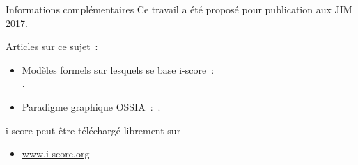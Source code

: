 \begin{block}{Informations complémentaires}
	Ce travail a été proposé pour publication aux JIM 2017.
      {Articles sur ce sujet~:
      \begin{itemize}
        \item Modèles formels sur lesquels se base i-score~:~\\\cite{allombert_system_2007,arias2016authoring}.
        \item Paradigme graphique OSSIA~:~\cite{celerier2015ossia}.
      \end{itemize}
      \vspace{0.1in}\noindent i-score peut être téléchargé librement sur
      \begin{itemize}
        \item \url{www.i-score.org}
      \end{itemize}}
\end{block}